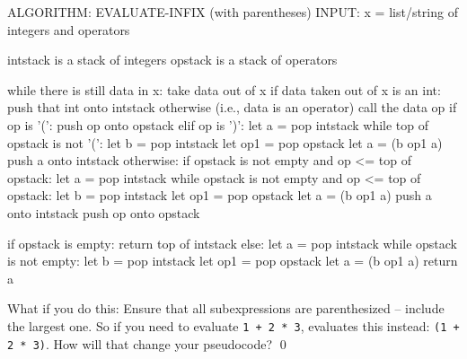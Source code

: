 \begin{console}
ALGORITHM: EVALUATE-INFIX (with parentheses)
INPUT: x = list/string of integers and operators

intstack is a stack of integers
opstack is a stack of operators

while there is still data in x:
    take data out of x
    if data taken out of x is an int:
        push that int onto intstack
    otherwise (i.e., data is an operator)
        call the data op
        if op is '(':
            push op onto opstack
        elif op is ')':
            let a = pop intstack
            while top of opstack is not '(':
                let b = pop intstack
                let op1 = pop opstack
                let a = (b op1 a)
            push a onto intstack
        otherwise:
            if opstack is not empty and op <= top of opstack:
                let a = pop intstack
                while opstack is not empty and
                    op <= top of opstack:
                    let b = pop intstack
                    let op1 = pop opstack
                    let a = (b op1 a)
                push a onto intstack
            push op onto opstack

if opstack is empty:
    return top of intstack
else:
    let a = pop intstack
    while opstack is not empty:
        let b = pop intstack
        let op1 = pop opstack
        let a = (b op1 a)
    return a
\end{console}

\begin{ex}
What if you do this:
Ensure that all subexpressions
are parenthesized -- include the largest one.
So if you need to evaluate \texttt{1 + 2 * 3},
evaluates this instead:
\texttt{(1 + 2 * 3)}.
How will that change your pseudocode?
\qed
\end{ex}

